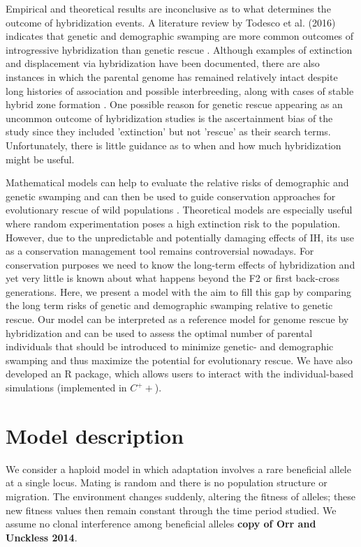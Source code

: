 \documentclass[a4paper,10pt]{article}
\begin{document}
	Empirical and theoretical results are inconclusive as to what determines the outcome of hybridization events. A literature review by Todesco et al. (2016) indicates that genetic and demographic swamping are more common outcomes of introgressive hybridization than genetic rescue \cite{todesco2016hybridization}. Although examples of extinction and displacement via hybridization have been documented, there are also instances in which the parental genome has remained relatively intact despite long histories of association and possible interbreeding, along with cases of stable hybrid zone formation \cite{vila2003rescue} \cite{madsen2004novel}. One possible reason for genetic rescue appearing as an uncommon outcome of hybridization studies is the ascertainment bias of the study since they included 'extinction' but not 'rescue' as their search terms. Unfortunately, there is little guidance as to when and how much hybridization might be useful.
	
	Mathematical models can help to evaluate the relative risks of demographic and genetic swamping and can then be used to guide conservation approaches for evolutionary rescue of wild populations \cite{aitken2013assisted} \cite{baskett2011introgressive}. Theoretical models are especially useful where random experimentation poses a high extinction risk to the population. However, due to the unpredictable and potentially damaging effects of IH, its use as a conservation management tool remains controversial nowadays. For conservation purposes we need to know the long-term effects of hybridization and yet very little is known about what happens beyond the F2 or first back-cross generations. Here, we present a model with the aim to fill this gap by comparing the long term risks of genetic and demographic swamping relative to genetic rescue. Our model can be interpreted as a reference model for genome rescue by hybridization and can be used to assess the optimal number of parental individuals that should be introduced to minimize genetic- and demographic swamping and thus maximize the potential for evolutionary rescue. We  have also developed an R package, which allows users to interact with the individual-based simulations (implemented in $C^++$).
	
	\section*{Model description}

    We consider a haploid model in which adaptation involves a rare beneficial allele at a single locus. Mating is random and there is no population structure or migration. The environment changes suddenly, altering the fitness of alleles; these new fitness values then remain constant through the time period studied. We assume no clonal interference among beneficial alleles \textbf{copy of Orr and Unckless 2014}. 
    
\end{document}
